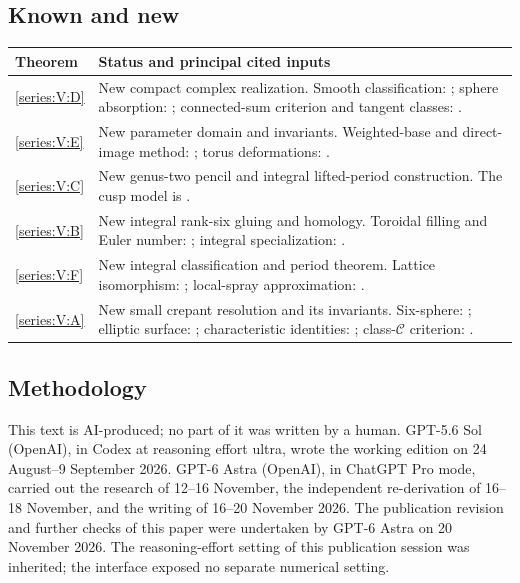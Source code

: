 \subsection{Known and new}\label{pub:V:known-new}
\begin{center}\small
\begin{tabularx}{\textwidth}{@{}lX@{}}\toprule
Theorem & Status and principal cited inputs\\\midrule
\ref{series:V:D} & New compact complex realization. Smooth classification: \cite[Definition~3.6 and Theorem~3.7(1), arXiv v3, pp.~12--14]{IVVWallForm}; sphere absorption: \cite[Theorem~A, p.~178]{IVVKramerStolz}; connected-sum criterion and tangent classes: \cite[Corollary~1.4, p.~4, Lemma~2.1, p.~5, and Theorem~2.4, p.~7]{ffMandal}.\\
\ref{series:V:E} & New parameter domain and invariants. Weighted-base and direct-image method: \cite[Lemmas~6.1--6.2, pp.~74--75, Proposition~6.10, pp.~79--80]{DGKX2026v1}; torus deformations: \cite[Theorem~2.1, p.~264]{Catanese2004}.\\
\ref{series:V:C} & New genus-two pencil and integral lifted-period construction. The cusp model is \cite[Theorem~8.7, arXiv v1, pp.~57--59]{Yang2026}.\\
\ref{series:V:B} & New integral rank-six gluing and homology. Toroidal filling and Euler number: \cite[Theorem~8.7 and Corollary~8.8, arXiv v1, pp.~57--59]{Yang2026}; integral specialization: \cite[\S7.7, pp.~60--63]{AC26}.\\
\ref{series:V:F} & New integral classification and period theorem. Lattice isomorphism: \cite[Theorem~3.4, p.~6, Algorithm~8.3, p.~21]{rootBHJ22}; local-spray approximation: \cite[Proposition~7.13 and preceding paragraph, arXiv v5, pp.~23--24]{IVVOkaOneV5}.\\
\ref{series:V:A} & New small crepant resolution and its invariants. Six-sphere: \cite[Theorems~7.17 and~7.22, pp.~57 and~60]{AC26}; elliptic surface: \cite[\S2, arXiv v1, p.~3]{E26}; characteristic identities: \cite[(1.2)--(1.4), pp.~3--4]{ffEsoleKang}; class-$\mathcal C$ criterion: \cite[Theorem~1.1, Remark~1.2, p.~2]{ffJiaMeng}.\\
\bottomrule\end{tabularx}\end{center}
\subsection{Methodology}
This text is AI-produced; no part of it was written by a human.
GPT-5.6 Sol (OpenAI), in Codex at reasoning effort ultra, wrote the
working edition on 24 August--9 September 2026. GPT-6 Astra (OpenAI),
in ChatGPT Pro mode, carried out the research of 12--16 November,
the independent re-derivation of 16--18 November, and the writing of
16--20 November 2026. The publication revision and further checks of
this paper were undertaken by GPT-6 Astra on 20 November 2026.
The reasoning-effort setting of this publication session was inherited;
the interface exposed no separate numerical setting.

